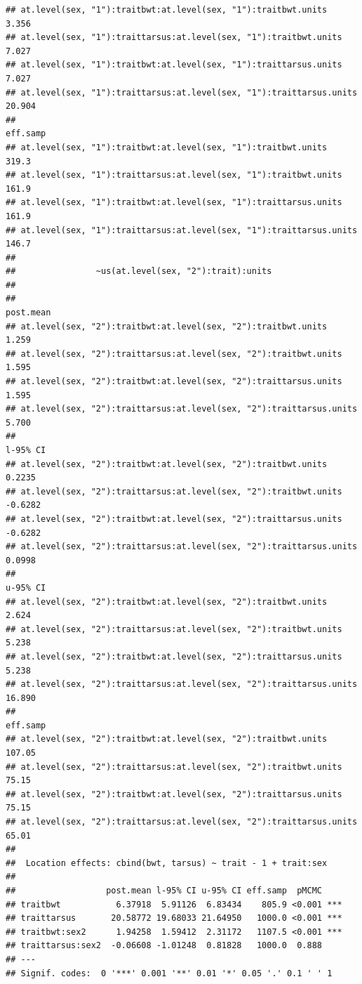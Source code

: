 \documentclass[
  12pt,
]{book}
\begin{document}
\begin{verbatim}
## at.level(sex, "1"):traitbwt:at.level(sex, "1"):traitbwt.units          3.356
## at.level(sex, "1"):traittarsus:at.level(sex, "1"):traitbwt.units       7.027
## at.level(sex, "1"):traitbwt:at.level(sex, "1"):traittarsus.units       7.027
## at.level(sex, "1"):traittarsus:at.level(sex, "1"):traittarsus.units   20.904
##                                                                     eff.samp
## at.level(sex, "1"):traitbwt:at.level(sex, "1"):traitbwt.units          319.3
## at.level(sex, "1"):traittarsus:at.level(sex, "1"):traitbwt.units       161.9
## at.level(sex, "1"):traitbwt:at.level(sex, "1"):traittarsus.units       161.9
## at.level(sex, "1"):traittarsus:at.level(sex, "1"):traittarsus.units    146.7
## 
##                ~us(at.level(sex, "2"):trait):units
## 
##                                                                     post.mean
## at.level(sex, "2"):traitbwt:at.level(sex, "2"):traitbwt.units           1.259
## at.level(sex, "2"):traittarsus:at.level(sex, "2"):traitbwt.units        1.595
## at.level(sex, "2"):traitbwt:at.level(sex, "2"):traittarsus.units        1.595
## at.level(sex, "2"):traittarsus:at.level(sex, "2"):traittarsus.units     5.700
##                                                                     l-95% CI
## at.level(sex, "2"):traitbwt:at.level(sex, "2"):traitbwt.units         0.2235
## at.level(sex, "2"):traittarsus:at.level(sex, "2"):traitbwt.units     -0.6282
## at.level(sex, "2"):traitbwt:at.level(sex, "2"):traittarsus.units     -0.6282
## at.level(sex, "2"):traittarsus:at.level(sex, "2"):traittarsus.units   0.0998
##                                                                     u-95% CI
## at.level(sex, "2"):traitbwt:at.level(sex, "2"):traitbwt.units          2.624
## at.level(sex, "2"):traittarsus:at.level(sex, "2"):traitbwt.units       5.238
## at.level(sex, "2"):traitbwt:at.level(sex, "2"):traittarsus.units       5.238
## at.level(sex, "2"):traittarsus:at.level(sex, "2"):traittarsus.units   16.890
##                                                                     eff.samp
## at.level(sex, "2"):traitbwt:at.level(sex, "2"):traitbwt.units         107.05
## at.level(sex, "2"):traittarsus:at.level(sex, "2"):traitbwt.units       75.15
## at.level(sex, "2"):traitbwt:at.level(sex, "2"):traittarsus.units       75.15
## at.level(sex, "2"):traittarsus:at.level(sex, "2"):traittarsus.units    65.01
## 
##  Location effects: cbind(bwt, tarsus) ~ trait - 1 + trait:sex 
## 
##                  post.mean l-95% CI u-95% CI eff.samp  pMCMC    
## traitbwt           6.37918  5.91126  6.83434    805.9 <0.001 ***
## traittarsus       20.58772 19.68033 21.64950   1000.0 <0.001 ***
## traitbwt:sex2      1.94258  1.59412  2.31172   1107.5 <0.001 ***
## traittarsus:sex2  -0.06608 -1.01248  0.81828   1000.0  0.888    
## ---
## Signif. codes:  0 '***' 0.001 '**' 0.01 '*' 0.05 '.' 0.1 ' ' 1
\end{verbatim}
\end{document}
